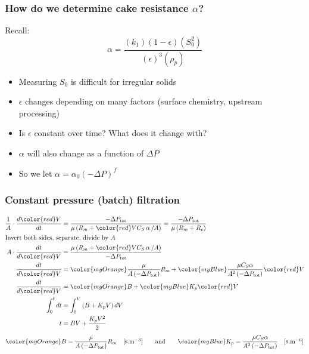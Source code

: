 \begin{frame}\frametitle{How do we determine cake resistance $\alpha$?}
	Recall:
	\[ \alpha = \dfrac{(k_1) \left(1-\epsilon\right)(S_0^2)}{(\epsilon)^3 (\rho_p)} \]
	\begin{itemize}
		\item	Measuring $S_0$ is difficult for irregular solids
		\item	$\epsilon$ changes depending on many factors (surface chemistry, upstream processing)
		\item	Is $\epsilon$ constant over time? What does it change with?
		\item	$\alpha$ will also change as a function of $\Delta P$
		\item	So we let $\alpha = \alpha_\text{0} \left(-\Delta P\right)^f$
	\end{itemize}

\end{frame}

\begin{frame}\frametitle{Constant pressure (batch) filtration}
	\begin{align*}
	   \dfrac{1}{A} \cdot \dfrac{d{\color{red}V}}{dt} &= \dfrac{-\Delta P_\text{tot}}{\mu \left(R_m + {\color{red}V} C_S \, \mathbf{ \alpha}\, / A \right)} =  \dfrac{-\Delta P_\text{tot}}{\mu \left(R_m + R_c \right)}\\
	   \intertext{Invert both sides, separate, divide by $A$}
	   A \cdot \dfrac{dt}{d{\color{red}V}} &= \dfrac{\mu \left(R_m + {\color{red}V}  C_S \, \mathbf{ \alpha}\, / A \right)}{-\Delta P_\text{tot}}\\
	   \dfrac{dt}{d{\color{red}V}} &= {\color{myOrange}\dfrac{\mu}{A\left(-\Delta P_\text{tot}\right)} R_m} + {\color{myBlue}\dfrac{\mu C_S \alpha  }{A^2 \left(-\Delta P_\text{tot}\right)}}{\color{red}V}\\
	   \dfrac{dt}{d{\color{red}V}} &= {\color{myOrange}B} + {\color{myBlue}K_p}{\color{red}V}\\
	   \int_{0}^{t}{dt} &= \int_{0}^{V}{\left(B + K_pV\right)dV}\\
	   t &= BV +  \dfrac{K_pV^2}{2}
	\end{align*}
	${\color{myOrange}B = \dfrac{\mu}{A\left(-\Delta P_\text{tot}\right)} R_m \quad [\text{s.m}^{-3}]} \qquad \text{and} \qquad {\color{myBlue}K_p = \dfrac{\mu C_S \alpha  }{A^2 \left(-\Delta P_\text{tot}\right)} \quad [\text{s.m}^{-6}]}$
\end{frame}

